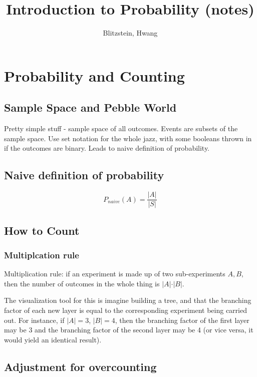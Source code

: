 \documentclass{article}
\begin{document}
\title{Introduction to Probability (notes)}
\author{Blitzstein, Hwang}
\date{}

\maketitle

\section{Probability and Counting}

	\subsection{Sample Space and Pebble World}
	
		Pretty simple stuff - sample space of all outcomes. Events are subsets of the sample space. Use set notation for the whole jazz, with some booleans thrown in if the outcomes are binary. Leads to naive definition of probability.
		
	\subsection{Naive definition of probability}
	
		$$P_{naive}(A) = \frac{|A|}{\vert S\vert}$$
		
		
	\subsection{How to Count}
	
		\subsubsection{Multiplcation rule}
	
			Multiplication rule: if an experiment is made up of two sub-experiments $A, B$, then the number of outcomes in the whole thing is $\vert A\vert \cdot \vert B\vert$. 
		
			The visualization tool for this is imagine building a tree, and that the branching factor of each new layer is equal to the corresponding experiment being carried out. For instance, if $\vert A\vert = 3$, $\vert B\vert = 4$, then the branching factor of the first layer may be 3 and the branching factor of the second layer may be 4 (or vice versa, it would yield an identical result).
		
		\subsection{Adjustment for overcounting}
		
\end{document}
